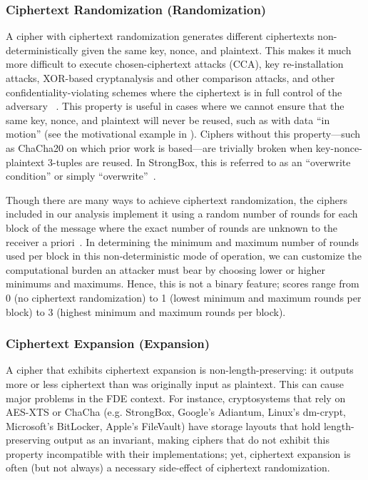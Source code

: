 \subsubsection{Ciphertext Randomization (Randomization)}

A cipher with ciphertext randomization generates different ciphertexts
non-deterministically given the same key, nonce, and plaintext. This makes it
much more difficult to execute chosen-ciphertext attacks (CCA), key
re-installation attacks, XOR-based cryptanalysis and other comparison attacks,
and other confidentiality-violating schemes where the ciphertext is in full
control of the adversary ~\cite{Freestyle}. This property is useful in cases
where we cannot ensure that the same key, nonce, and plaintext will never be
reused, such as with data ``in motion'' (see the motivational example in
). Ciphers without this property---such as ChaCha20 on which
prior work is based---are trivially broken when key-nonce-plaintext 3-tuples are
reused. In StrongBox, this is referred to as an ``overwrite condition'' or
simply ``overwrite''~\cite{StrongBox}.

Though there are many ways to achieve ciphertext randomization, the ciphers
included in our analysis implement it using a random number of rounds for each
block of the message where the exact number of rounds are unknown to the
receiver a priori~\cite{Freestyle}. In determining the minimum and maximum
number of rounds used per block in this non-deterministic mode of operation, we
can customize the computational burden an attacker must bear by choosing lower
or higher minimums and maximums. Hence, this is not a binary feature; scores
range from 0 (no ciphertext randomization) to 1 (lowest minimum and maximum
rounds per block) to 3 (highest minimum and maximum rounds per block).

\subsubsection{Ciphertext Expansion (Expansion)}

A cipher that exhibits ciphertext expansion is non-length-preserving: it outputs
more or less ciphertext than was originally input as plaintext. This can cause
major problems in the FDE context. For instance, cryptosystems that rely on
AES-XTS or ChaCha (e.g. StrongBox, Google's Adiantum, Linux's dm-crypt,
Microsoft's BitLocker, Apple's FileVault) have storage layouts that hold
length-preserving output as an invariant, making ciphers that do not exhibit
this property incompatible with their implementations; yet, ciphertext expansion
is often (but not always) a necessary side-effect of ciphertext randomization.

